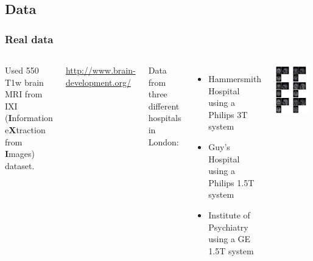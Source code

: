 \documentclass{beamer}
\begin{document}
\subsection{Data}
\begin{frame}
\frametitle{Real data}
\begin{columns}[c]
Used 550 T1w brain MRI from IXI ({\bf I}nformation e{\bf X}traction from {\bf I}mages) dataset.

\url{http://www.brain-development.org/}

Data from three different hospitals in London:
\begin{itemize}
\item{Hammersmith Hospital using a Philips 3T system}
\item{Guy's Hospital using a Philips 1.5T system}
\item{Institute of Psychiatry using a GE 1.5T system}
\end{itemize}

\includegraphics[width=0.9\textwidth]{orig_ixi}
\end{columns}
\end{frame}
\end{document}
